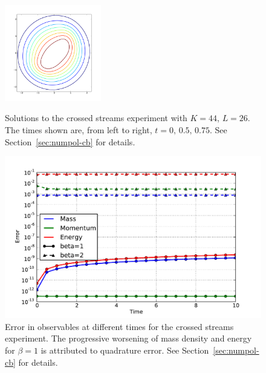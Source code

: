 \begin{figure}
{    \includegraphics[width=4.2cm]{figs/polboltz/scrossed-b2-i3}
}
\caption{Solutions to the crossed streams experiment with $K=44$, $L=26$.  The times shown are, from left to
right, $t=0,\,0.5,\,0.75$. See Section~\vref{sec:numpol-cb} for details.}
\label{fig:numpol-cb}
\end{figure}

\begin{figure}
    \centering
    \includegraphics[width=12cm]{figs/polboltz/scrossed-obs}
    \caption{Error in observables at different times for the crossed streams experiment. The progressive
    worsening of mass density and energy for $\beta=1$ is attributed to quadrature error. See
    Section~\vref{sec:numpol-cb} for details.}
    \label{fig:numpol-cb-obs}
\end{figure}

